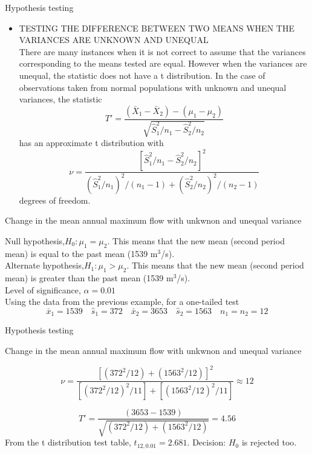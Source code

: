 \documentclass[8pt]{beamer}
\renewcommand{\emph}[1]{\textcolor{myorange}{#1}}
\begin{document}
\begin{frame}{Hypothesis testing}
   \begin{itemize}
        \item \alert{TESTING THE DIFFERENCE BETWEEN TWO MEANS WHEN THE VARIANCES ARE UNKNOWN AND UNEQUAL}\\
There are many instances when it is not correct to assume that the variances corresponding to the means tested are equal. However when the variances are unequal, the statistic does not have a t distribution. In the case of observations taken from normal populations with unknown and unequal variances, the statistic
\[
    T' = \frac{(\bar{X}_1 - \bar{X}_2) - (\mu_1 - \mu_2)}{\sqrt{\hat{S}_1^2 /n_1 - \hat{S}_2^2 /n_2}} 
\]
has an approximate t distribution with
\[
    \nu = \frac{\left[ \hat{S}_1^2 /n_1 - \hat{S}_2^2 /n_2 \right]^2}{ (\hat{S}_1^2 /n_1)^2 / (n_1-1) + (\hat{S}_2^2 /n_2)^2 /(n_2 -1) }
\]
degrees of freedom.
    \end{itemize}

    \begin{exampleblock}{Change in  the mean annual maximum flow with unkwnon and unequal variance}

    \emph{Null hypothesis},$H_0 : \mu_1 = \mu_2$. This means that the new mean (second period mean) is equal to the past mean (1539 m$^3$/s).\\
    \emph{Alternate hypothesis},$H_1 : \mu_1 > \mu_2$. This means that the new mean (second period mean) is greater than the past mean (1539 m$^3$/s).\\
    \emph{Level of significance}, $\alpha = 0.01$ \\
    Using the data from the previous example, for a one-tailed test
\[
    \bar{x}_1 = 1539 \quad \hat{s}_1 = 372 \quad \bar{x}_2 = 3653 \quad \hat{s}_2 = 1563 \quad n_1 = n_2 = 12
\]

    \end{exampleblock}
\end{frame}

\begin{frame}{Hypothesis testing}
    \begin{exampleblock}{Change in  the mean annual maximum flow with unkwnon and unequal variance}

        \[
            \nu = \frac{\left[(372^2 / 12) + (1563^2 / 12) \right]^2}{ \left[(372^2 / 12)^2 /11\right] +  \left[(1563^2 / 12)^2 /11\right]} \approx  12
        \]

        \[
            T' = \frac{(3653-1539)}{\sqrt{(372^2 / 12) + (1563^2 / 12)}} = 4.56
        \]
        From the \emph{t distribution} test table, $t_{12, 0.01} = 2.681$. \emph{Decision: $H_0$ is rejected too}.

    \end{exampleblock}
\end{frame}
\end{document}
